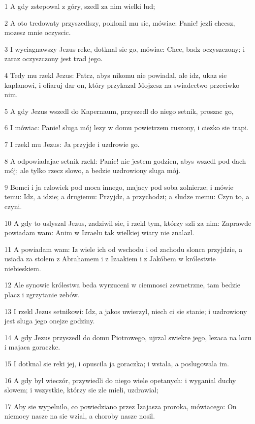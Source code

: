 \par 1 A gdy zstepowal z góry, szedl za nim wielki lud;
\par 2 A oto tredowaty przyszedlszy, poklonil mu sie, mówiac: Panie! jezli chcesz, mozesz mnie oczyscic.
\par 3 I wyciagnawszy Jezus reke, dotknal sie go, mówiac: Chce, badz oczyszczony; i zaraz oczyszczony jest trad jego.
\par 4 Tedy mu rzekl Jezus: Patrz, abys nikomu nie powiadal, ale idz, ukaz sie kaplanowi, i ofiaruj dar on, który przykazal Mojzesz na swiadectwo przeciwko nim.
\par 5 A gdy Jezus wszedl do Kapernaum, przyszedl do niego setnik, proszac go,
\par 6 I mówiac: Panie! sluga mój lezy w domu powietrzem ruszony, i ciezko sie trapi.
\par 7 I rzekl mu Jezus: Ja przyjde i uzdrowie go.
\par 8 A odpowiadajac setnik rzekl: Panie! nie jestem godzien, abys wszedl pod dach mój; ale tylko rzecz slowo, a bedzie uzdrowiony sluga mój.
\par 9 Bomci i ja czlowiek pod moca innego, majacy pod soba zolnierze; i mówie temu: Idz, a idzie; a drugiemu: Przyjdz, a przychodzi; a sludze memu: Czyn to, a czyni.
\par 10 A gdy to uslyszal Jezus, zadziwil sie, i rzekl tym, którzy szli za nim: Zaprawde powiadam wam: Anim w Izraelu tak wielkiej wiary nie znalazl.
\par 11 A powiadam wam: Iz wiele ich od wschodu i od zachodu slonca przyjdzie, a usiada za stolem z Abrahamem i z Izaakiem i z Jakóbem w królestwie niebieskiem.
\par 12 Ale synowie królestwa beda wyrzuceni w ciemnosci zewnetrzne, tam bedzie placz i zgrzytanie zebów.
\par 13 I rzekl Jezus setnikowi: Idz, a jakos uwierzyl, niech ci sie stanie; i uzdrowiony jest sluga jego onejze godziny.
\par 14 A gdy Jezus przyszedl do domu Piotrowego, ujrzal swiekre jego, lezaca na lozu i majaca goraczke.
\par 15 I dotknal sie reki jej, i opuscila ja goraczka; i wstala, a poslugowala im.
\par 16 A gdy byl wieczór, przywiedli do niego wiele opetanych: i wyganial duchy slowem; i wszystkie, którzy sie zle mieli, uzdrawial;
\par 17 Aby sie wypelnilo, co powiedziano przez Izajasza proroka, mówiacego: On niemocy nasze na sie wzial, a choroby nasze nosil.
